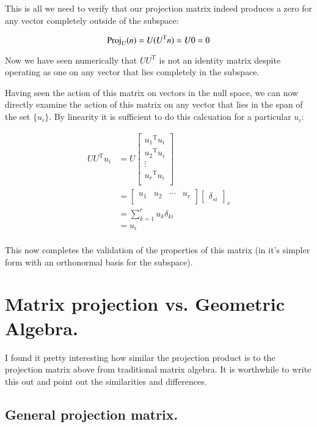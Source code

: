 \documentclass{article}      %
\newcommand{\transpose}[1]{{{#1}^{\text{T}}}}
\begin{document}
This is all we need to verify that our projection matrix indeed produces a zero for any vector completely outside of the subspace:

\[
\Proj_U(n) = U (\transpose{U} n) = U 0 = 0
\]

Now we have seen numerically that $U \transpose{U}$ is not an identity matrix despite 
operating as one on any vector that lies completely in the subspace.

Having seen the action of this matrix on vectors in the null space, we can now
directly examine the action of this matrix on any vector that lies in the
span of the set $\{u_i\}$.  By linearity it is sufficient to do this calcuation 
for a particular $u_i$:

\begin{align*}
U \transpose{U} u_i
&=
U
\begin{bmatrix}
\transpose{u_1} u_i \\
\transpose{u_2} u_i \\
\vdots \\
\transpose{u_r} u_i \\
\end{bmatrix}
\\
&=
\begin{bmatrix}
{u_1} & {u_2} & \cdots & {u_r} \\
\end{bmatrix}
{
\begin{bmatrix}
\delta_{si}
\end{bmatrix}
}_s \\
&= \sum_{k=1}^{r} u_k \delta_{ki} \\
&= u_i \\
\end{align*}

This now completes the validation of the properties of this matrix (in it's simpler form with an orthonormal basis for the subspace).

\section{ Matrix projection vs. Geometric Algebra. }

I found it pretty interesting how similar the projection product is to the projection matrix above from traditional matrix algebra.  It is worthwhile
to write this out and point out the similarities and differences.

\subsection{ General projection matrix. }
\end{document}
